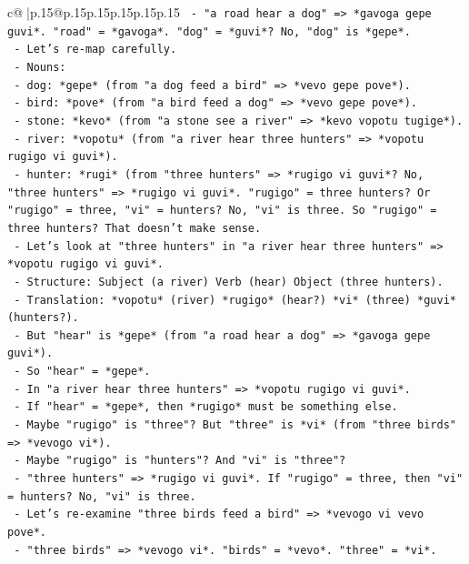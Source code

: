 \documentclass{article}
\begin{document}
{\begin{supertabular}{c@{$\;$}|p{.15\linewidth}@{}p{.15\linewidth}p{.15\linewidth}p{.15\linewidth}p{.15\linewidth}p{.15\linewidth}}
{{{\texttt{  {-} "a road hear a dog" => *gavoga gepe guvi*. "road" = *gavoga*. "dog" = *guvi*? No, "dog" is *gepe*.} \\
\texttt{  {-} Let's re{-}map carefully.} \\
\texttt{  {-} Nouns:} \\
\texttt{    {-} dog: *gepe* (from "a dog feed a bird" => *vevo gepe pove*).} \\
\texttt{    {-} bird: *pove* (from "a bird feed a dog" => *vevo gepe pove*).} \\
\texttt{    {-} stone: *kevo* (from "a stone see a river" => *kevo vopotu tugige*).} \\
\texttt{    {-} river: *vopotu* (from "a river hear three hunters" => *vopotu rugigo vi guvi*).} \\
\texttt{    {-} hunter: *rugi* (from "three hunters" => *rugigo vi guvi*? No, "three hunters" => *rugigo vi guvi*. "rugigo" = three hunters? Or "rugigo" = three, "vi" = hunters? No, "vi" is three. So "rugigo" = three hunters? That doesn't make sense.} \\
\texttt{    {-} Let's look at "three hunters" in "a river hear three hunters" => *vopotu rugigo vi guvi*.} \\
\texttt{      {-} Structure: Subject (a river) Verb (hear) Object (three hunters).} \\
\texttt{      {-} Translation: *vopotu* (river) *rugigo* (hear?) *vi* (three) *guvi* (hunters?).} \\
\texttt{      {-} But "hear" is *gepe* (from "a road hear a dog" => *gavoga gepe guvi*).} \\
\texttt{      {-} So "hear" = *gepe*.} \\
\texttt{      {-} In "a river hear three hunters" => *vopotu rugigo vi guvi*.} \\
\texttt{      {-} If "hear" = *gepe*, then *rugigo* must be something else.} \\
\texttt{      {-} Maybe "rugigo" is "three"? But "three" is *vi* (from "three birds" => *vevogo vi*).} \\
\texttt{      {-} Maybe "rugigo" is "hunters"? And "vi" is "three"?} \\
\texttt{      {-} "three hunters" => *rugigo vi guvi*. If "rugigo" = three, then "vi" = hunters? No, "vi" is three.} \\
\texttt{      {-} Let's re{-}examine "three birds feed a bird" => *vevogo vi vevo pove*.} \\
\texttt{        {-} "three birds" => *vevogo vi*. "birds" = *vevo*. "three" = *vi*.} \\
}}}
\end{supertabular}}
\end{document}
